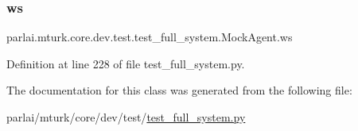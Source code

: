 \subsubsection{\texorpdfstring{ws}{ws}}
{\footnotesize\ttfamily parlai.\+mturk.\+core.\+dev.\+test.\+test\+\_\+full\+\_\+system.\+Mock\+Agent.\+ws}



Definition at line 228 of file test\+\_\+full\+\_\+system.\+py.



The documentation for this class was generated from the following file\+:\begin{DoxyCompactItemize}
\item 
parlai/mturk/core/dev/test/\hyperlink{dev_2test_2test__full__system_8py}{test\+\_\+full\+\_\+system.\+py}\end{DoxyCompactItemize}
